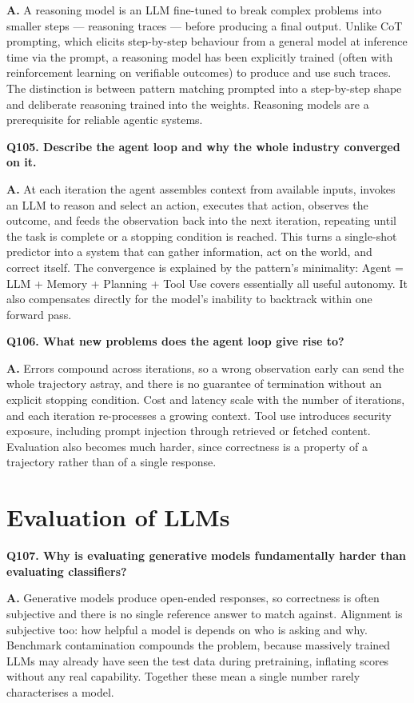 \documentclass[11pt]{article}
\begin{document}
\noindent\textbf{A.} A reasoning model is an LLM fine-tuned to break complex problems into smaller steps --- reasoning traces --- before producing a final output. Unlike CoT prompting, which elicits step-by-step behaviour from a general model at inference time via the prompt, a reasoning model has been explicitly trained (often with reinforcement learning on verifiable outcomes) to produce and use such traces. The distinction is between pattern matching prompted into a step-by-step shape and deliberate reasoning trained into the weights. Reasoning models are a prerequisite for reliable agentic systems.

\medskip
\noindent\textbf{Q105. Describe the agent loop and why the whole industry converged on it.}

\noindent\textbf{A.} At each iteration the agent assembles context from available inputs, invokes an LLM to reason and select an action, executes that action, observes the outcome, and feeds the observation back into the next iteration, repeating until the task is complete or a stopping condition is reached. This turns a single-shot predictor into a system that can gather information, act on the world, and correct itself. The convergence is explained by the pattern's minimality: Agent = LLM + Memory + Planning + Tool Use covers essentially all useful autonomy. It also compensates directly for the model's inability to backtrack within one forward pass.

\medskip
\noindent\textbf{Q106. What new problems does the agent loop give rise to?}

\noindent\textbf{A.} Errors compound across iterations, so a wrong observation early can send the whole trajectory astray, and there is no guarantee of termination without an explicit stopping condition. Cost and latency scale with the number of iterations, and each iteration re-processes a growing context. Tool use introduces security exposure, including prompt injection through retrieved or fetched content. Evaluation also becomes much harder, since correctness is a property of a trajectory rather than of a single response.

\section{Evaluation of LLMs}

\noindent\textbf{Q107. Why is evaluating generative models fundamentally harder than evaluating classifiers?}

\noindent\textbf{A.} Generative models produce open-ended responses, so correctness is often subjective and there is no single reference answer to match against. Alignment is subjective too: how helpful a model is depends on who is asking and why. Benchmark contamination compounds the problem, because massively trained LLMs may already have seen the test data during pretraining, inflating scores without any real capability. Together these mean a single number rarely characterises a model.
\end{document}
